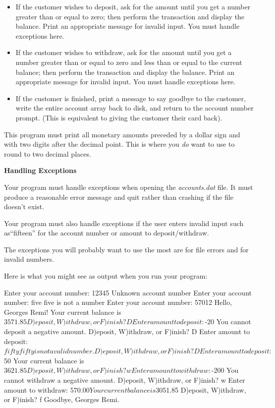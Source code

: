 \begin{exercise}
\begin{itemize}
    \item If the customer wishes to deposit, ask for the amount until you get a number greater than or equal to zero; then perform the transaction and display the balance. Print an appropriate message for invalid input. You must handle exceptions here.
    \item If the customer wishes to withdraw, ask for the amount until you get a number greater than or equal to zero and less than or equal to the current balance; then perform the transaction and display the balance. Print an appropriate message for invalid input. You must handle exceptions here.
    \item If the customer is finished, print a message to say goodbye to the customer, write the entire account array back to disk, and return to the account number prompt. (This is equivalent to giving the customer their card back).
\end{itemize}

This program must print all monetary amounts preceded by a dollar sign and with two digits after the decimal point. This is where you {\em do} want to use  to round to two decimal places.

{\large\bf{Handling Exceptions}}

Your program must handle exceptions when opening the {\em accounts.dat} file. It must produce a reasonable error message and quit rather than crashing if the file doesn't exist.

Your program must also handle exceptions if the user enters invalid input such as``fifteen'' for the account number or amount to deposit/withdraw.

The exceptions you will probably want to use the most are  for file errors and  for invalid numbers.

Here is what you might see as output when you run your program:

\begin{stdout}
Enter your account number: 12345
Unknown account number
Enter your account number: five
five is not a number
Enter your account number: 57012
Hello, Georges Remi!
Your current balance is $3571.85
D)eposit, W)ithdraw, or F)inish? D
Enter amount to deposit: $-20
You cannot deposit a negative amount.
D)eposit, W)ithdraw, or F)inish? D
Enter amount to deposit: $fifty
fifty is not a valid number.
D)eposit, W)ithdraw, or F)inish? D
Enter amount to deposit: $50
Your current balance is $3621.85
D)eposit, W)ithdraw, or F)inish? w
Enter amount to withdraw: $-200
You cannot withdraw a negative amount.
D)eposit, W)ithdraw, or F)inish? w
Enter amount to withdraw: $570.00
Your current balance is $3051.85
D)eposit, W)ithdraw, or F)inish? f
Goodbye, Georges Remi.


\end{stdout}
\end{exercise}
